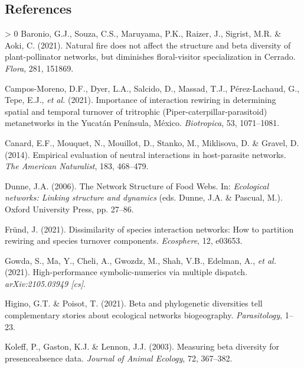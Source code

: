 \documentclass[10pt,oneside]{article}
\newlength{\cslhangindent}
\newenvironment{CSLReferences}[3] %
 {%
  \setlength{\parindent}{0pt}
  \ifodd #1 \everypar{\setlength{\hangindent}{\cslhangindent}}\ignorespaces\fi
  \ifnum #2 > 0
  \setlength{\parskip}{#2\baselineskip}
  \fi
 }%
 {}
\begin{document}
\hypertarget{references}{%
\subsection*{References}\label{references}}

\hypertarget{refs}{}
\begin{CSLReferences}{1}{0}
\leavevmode\hypertarget{ref-Baronio2021NatFir}{}%
Baronio, G.J., Souza, C.S., Maruyama, P.K., Raizer, J., Sigrist, M.R. \&
Aoki, C. (2021). Natural fire does not affect the structure and beta
diversity of plant-pollinator networks, but diminishes floral-visitor
specialization in Cerrado. \emph{Flora}, 281, 151869.

\leavevmode\hypertarget{ref-Campos-Moreno2021ImpInt}{}%
Campos-Moreno, D.F., Dyer, L.A., Salcido, D., Massad, T.J.,
Pérez-Lachaud, G., Tepe, E.J., \emph{et al.} (2021). Importance of
interaction rewiring in determining spatial and temporal turnover of
tritrophic (Piper-caterpillar-parasitoid) metanetworks in the Yucatán
Península, México. \emph{Biotropica}, 53, 1071--1081.

\leavevmode\hypertarget{ref-Canard2014EmpEva}{}%
Canard, E.F., Mouquet, N., Mouillot, D., Stanko, M., Miklisova, D. \&
Gravel, D. (2014). Empirical evaluation of neutral interactions in
host-parasite networks. \emph{The American Naturalist}, 183, 468--479.

\leavevmode\hypertarget{ref-Dunne2006NetStr}{}%
Dunne, J.A. (2006). The Network Structure of Food Webs. In:
\emph{Ecological networks: Linking structure and dynamics} (eds. Dunne,
J.A. \& Pascual, M.). Oxford University Press, pp. 27--86.

\leavevmode\hypertarget{ref-Frund2021DisSpe}{}%
Fründ, J. (2021). Dissimilarity of species interaction networks: How to
partition rewiring and species turnover components. \emph{Ecosphere},
12, e03653.

\leavevmode\hypertarget{ref-Gowda2021HigSym}{}%
Gowda, S., Ma, Y., Cheli, A., Gwozdz, M., Shah, V.B., Edelman, A.,
\emph{et al.} (2021). High-performance symbolic-numerics via multiple
dispatch. \emph{arXiv:2105.03949 {[}cs{]}}.

\leavevmode\hypertarget{ref-Higino2021BetPhy}{}%
Higino, G.T. \& Poisot, T. (2021). Beta and phylogenetic diversities
tell complementary stories about ecological networks biogeography.
\emph{Parasitology}, 1--23.

\leavevmode\hypertarget{ref-Koleff2003MeaBet}{}%
Koleff, P., Gaston, K.J. \& Lennon, J.J. (2003). Measuring beta
diversity for presenceabsence data. \emph{Journal of Animal Ecology},
72, 367--382.


\end{CSLReferences}
\end{document}
